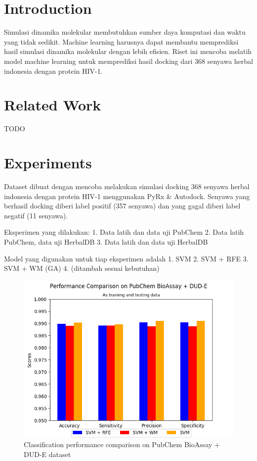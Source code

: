 \documentclass[conference,compsoc,12pt]{IEEEtran}
\begin{document}
\IEEEpeerreviewmaketitle

\section{Introduction}

Simulasi dinamika molekular membutuhkan sumber daya komputasi dan waktu yang tidak sedikit. Machine learning harusnya dapat membantu memprediksi hasil simulasi dinamika molekular dengan lebih efisien. Riset ini mencoba melatih model machine learning untuk memprediksi hasil docking dari 368 senyawa herbal indonesia dengan protein HIV-1. \cite{yanuar2014virtual}

\section{Related Work}

TODO


\section{Experiments} \label{Experiments}

Dataset dibuat dengan mencoba melakukan simulasi docking 368 senyawa herbal indonesia dengan protein HIV-1 menggunakan PyRx \& Autodock. Senyawa yang berhasil docking diberi label positif (357 senyawa) dan yang gagal diberi label negatif (11 senyawa).

Eksperimen yang dilakukan:
1. Data latih dan data uji PubChem
2. Data latih PubChem, data uji HerbalDB
3. Data latih dan data uji HerbalDB

Model yang digunakan untuk tiap eksperimen adalah
1. SVM
2. SVM + RFE
3. SVM + WM (GA)
4. (ditambah sesuai kebutuhan)

\begin{figure}
	\includegraphics[scale=0.5]{../images/03-evaluate-1_scores_chart.png}
	\caption{Classification performance comparison on PubChem BioAssay + DUD-E dataset}
	\label{fig_performance_comparison_pubchem}
\end{figure}
\end{document}
